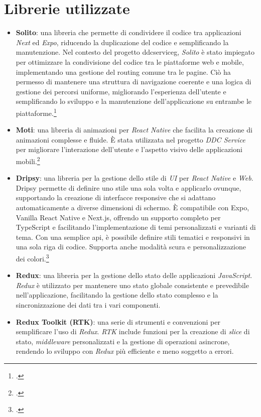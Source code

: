 \section{Librerie utilizzate}
\begin{itemize}
    \item \textbf{Solito}: una libreria che permette di condividere il codice tra applicazioni \textit{Next} ed \textit{Expo}, riducendo la duplicazione del codice e semplificando la manutenzione.
    Nel contesto del progetto \gls{ddcserviceg}\glox, \textit{Solito} è stato impiegato per ottimizzare la condivisione del codice tra le piattaforme web e mobile, implementando una gestione del routing comune tra le pagine.
    Ciò ha permesso di mantenere una struttura di navigazione coerente e una logica di gestione dei percorsi uniforme, migliorando l'esperienza dell'utente e semplificando lo sviluppo e la manutenzione dell'applicazione su entrambe le piattaforme.\footcite{site:solito}
    \item \textbf{Moti}: una libreria di animazioni per \textit{React Native} che facilita la creazione di animazioni complesse e fluide.
    È stata utilizzata nel progetto \textit{DDC Service} per migliorare l'interazione dell'utente e l'aspetto visivo delle applicazioni mobili.\footcite{site:moti}
    \item \textbf{Dripsy}: una libreria per la gestione dello stile di \textit{UI} per \textit{React Native} e \textit{Web}.
    Dripsy permette di definire uno stile una sola volta e applicarlo ovunque, supportando la creazione di interfacce responsive che si adattano automaticamente a diverse dimensioni di schermo. È compatibile con Expo, Vanilla React Native e Next.js, offrendo un supporto completo per TypeScript e facilitando l'implementazione di temi personalizzati e varianti di tema. Con una semplice \gls{api}\glox, è possibile definire stili tematici e responsivi in una sola riga di codice. Supporta anche modalità scura e personalizzazione dei colori.\footcite{site:dripsy}
    \item \textbf{Redux}: una libreria per la gestione dello stato delle applicazioni \textit{JavaScript}.
    \textit{Redux} è utilizzato per mantenere uno stato globale consistente e prevedibile nell'applicazione, facilitando la gestione dello stato complesso e la sincronizzazione dei dati tra i vari componenti.
    \item \textbf{Redux Toolkit (RTK)}: una serie di strumenti e convenzioni per semplificare l'uso di \textit{Redux}. \textit{RTK} include funzioni per la creazione di \textit{slice} di stato, \textit{middleware} personalizzati e la gestione di operazioni asincrone, rendendo lo sviluppo con \textit{Redux} più efficiente e meno soggetto a errori.

\end{itemize}
